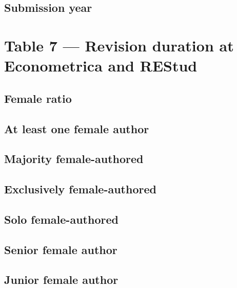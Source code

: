 \documentclass[12pt]{article}
\begin{document}
\subsection{Submission year}

\clearpage

\section{Table 7 --- Revision duration at Econometrica and REStud}

\subsection{Female ratio}

\clearpage

\subsection{At least one female author}

\clearpage

\subsection{Majority female-authored}

\clearpage

\subsection{Exclusively female-authored}

\clearpage

\subsection{Solo female-authored}

\clearpage

\subsection{Senior female author}

\clearpage

\subsection{Junior female author}

\clearpage
\end{document}
